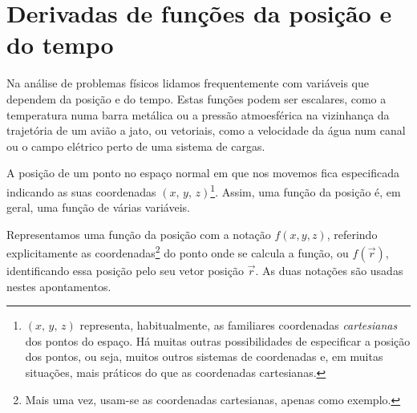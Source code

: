 \section{Derivadas de funções da posição e do tempo}
Na análise de problemas físicos lidamos frequentemente com variáveis que
dependem da posição e do tempo. Estas funções podem ser escalares, como a
temperatura numa barra metálica ou a pressão atmoesférica na vizinhança da
trajetória de um avião a jato, ou vetoriais, como a velocidade da água num canal
ou o campo elétrico perto de uma sistema de cargas.

A posição de um ponto no espaço normal em que nos movemos fica especificada
indicando as suas coordenadas $(x,\,y,\,z)$\footnote{$(x,\,y,\,z)$ representa,
habitualmente, as familiares coordenadas \emph{cartesianas} dos pontos do
espaço. Há muitas outras possibilidades de especificar a posição dos pontos, ou
seja, muitos outros sistemas de coordenadas e, em muitas situações, mais
práticos do que as coordenadas cartesianas.}. Assim, uma função da posição é, em
geral, uma função de várias variáveis.

Representamos uma função da posição com a notação $f(x,y,z)$, referindo
explicitamente as coordenadas\footnote{Mais uma vez, usam-se as coordenadas
cartesianas, apenas como exemplo.} do ponto onde se calcula a função, ou $f(\vec
r)$, identificando essa posição pelo seu vetor posição $\vec r$. As duas
notações são usadas nestes apontamentos.


